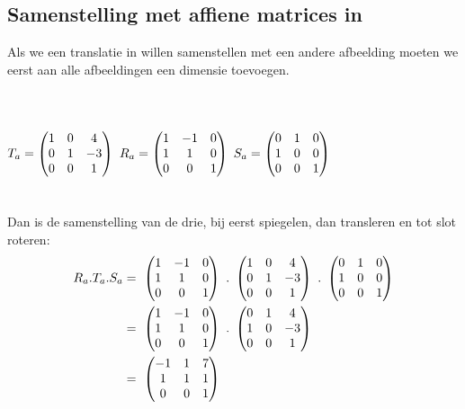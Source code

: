 \subsection{Samenstelling met affiene matrices in \RT}
Als we een translatie in \RT willen samenstellen met een andere afbeelding moeten we eerst aan alle afbeeldingen een dimensie toevoegen. \\ \\
  \\ \\ 
$ T_a = \begin{pmatrix}  1 & 0 & 4  \\  0 & 1 & -3  \\ 0 & 0 & 1  \end{pmatrix} $  \qquad
$ R_a = \begin{pmatrix}  1 & -1 & 0  \\  1 & 1 & 0  \\ 0 & 0 & 1  \end{pmatrix} $ \qquad
$ S_a = \begin{pmatrix}  0 & 1 & 0  \\  1 & 0 & 0  \\ 0 & 0 & 1  \end{pmatrix} $ \\ \\ \\
Dan is de samenstelling van de drie, bij eerst spiegelen, dan transleren en tot slot roteren:
\begin{align*} 
R_a . T_a . S_a & = \ 
\matdrie{ 1 & -1 & 0 }
{ 1 & 1 & 0 }
{0 & 0 & 1 } \ . \ 
\matdrie{ 1 & 0 & 4 } 
{ 0 & 1 & -3 }
{0 & 0 & 1 } \ . \ 
\matdrie{ 0 & 1 & 0 }  
{ 1 & 0 & 0 }
{0 & 0 & 1 }   \\
& = \ 
\matdrie{ 1 & -1 & 0 }
{ 1 & 1 & 0 }
{0 & 0 & 1 } \ . \ 
\matdrie{ 0 & 1 & 4 }  
{ 1 & 0 & -3 }
{0 & 0 & 1 }   \\
& = \ 
\matdrie{ -1 & 1 & 7 }  
{ 1 & 1 & 1 }
{0 & 0 & 1 }   
\end{align*} 

